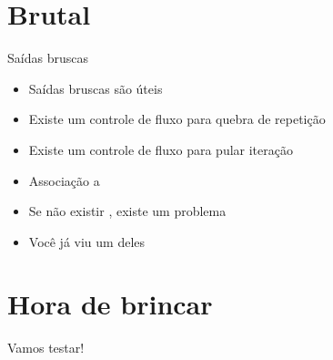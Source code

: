 \documentclass[14pt]{beamer}
\begin{document}
		\begin{frame}
			
		\end{frame}

	\section{Brutal}
		\begin{frame}{Saídas bruscas}
			\begin{itemize}
				\presentationPause\item Saídas bruscas são úteis
				\presentationPause\item Existe um controle de fluxo para quebra de repetição
				\presentationPause\item Existe um controle de fluxo para pular iteração
				\presentationPause\item Associação a 
				\presentationPause\item Se não existir , existe um problema
				\presentationPause\item Você já viu um deles
			\end{itemize}
			\presentationPause
		\end{frame}

		\begin{frame}
			
		\end{frame}
		
	\section{Hora de brincar}
		\begin{frame}
			\begin{center}\Huge
				Vamos testar!
			\end{center}
		\end{frame}
\end{document}
